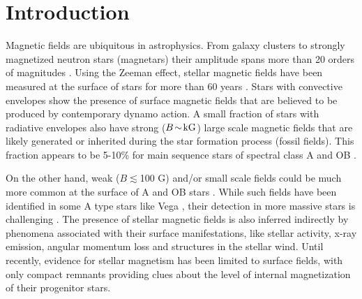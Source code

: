 \section{Introduction}
\label{intro}
Magnetic fields are ubiquitous in astrophysics. From  galaxy clusters to strongly magnetized neutron stars (magnetars) their amplitude spans more than 20 orders of magnitudes \citep{Brandenburg_2005}. Using the Zeeman effect, stellar magnetic fields have been measured at the surface of stars
for more than 60 years \citep{Babcock_1947,Landstreet_1992,Donati_2009}. Stars with convective envelopes show the presence of surface magnetic fields that are believed to be produced by contemporary dynamo action. A small fraction of stars with radiative envelopes also have strong ($B \! \sim \! {\rm kG}$) large scale magnetic fields that are likely generated or inherited during the star formation process (fossil fields). This fraction appears to be 5-10\% for main sequence stars of spectral class A \citep[e.g.,][]{Auriere2004} and OB \citep{2012ASPC..464..405W}.

On the other hand, weak ($B \! \lesssim$100 G) and/or small scale fields could be much more common at the surface of A and OB stars \citep{Cantiello_2011,Braithwaite_2012}. While such fields have been identified in some A type stars like Vega \citep{Lignieres2009}, their detection in more massive stars is challenging \citep{2013A&A...554A..93K}. The presence of stellar magnetic fields is also inferred indirectly by phenomena associated with their surface manifestations, like stellar activity, x-ray emission, angular momentum loss and structures in the stellar wind. Until recently, evidence for stellar magnetism has been limited to surface fields, with only compact remnants providing clues about the level of internal magnetization of their progenitor stars.

